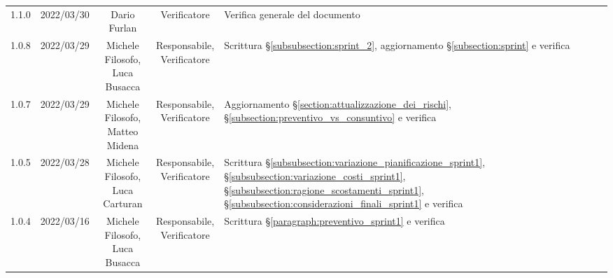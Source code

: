 \begin{center}
\begin{longtable}[c]{c | c | c | c | p{5cm}}
		1.1.0                                                      & 2022/03/30 & Dario Furlan                           & Verificatore   & Verifica generale del documento                                                                                                           \\
		1.0.8                                                      & 2022/03/29 & \Shortunderstack{Michele Filosofo,                                                                                                                                                                  \\Luca Busacca} & \Shortunderstack{Responsabile,\\Verificatore} & Scrittura §\ref{subsubsection:sprint_2}, aggiornamento §\ref{subsection:sprint} e verifica\\
		1.0.7                                                      & 2022/03/29 & \Shortunderstack{Michele Filosofo,                                                                                                                                                                  \\Matteo Midena} & \Shortunderstack{Responsabile,\\Verificatore} & Aggiornamento §\ref{section:attualizzazione_dei_rischi}, §\ref{subsection:preventivo_vs_consuntivo} e verifica\\
		1.0.5                                                      & 2022/03/28 & \Shortunderstack{Michele Filosofo,                                                                                                                                                                  \\Luca Carturan} & \Shortunderstack{Responsabile,\\Verificatore} & Scrittura §\ref{subsubsection:variazione_pianificazione_sprint1}, §\ref{subsubsection:variazione_costi_sprint1}, §\ref{subsubsection:ragione_scostamenti_sprint1}, §\ref{subsubsection:considerazioni_finali_sprint1} e verifica\\
		1.0.4                                                      & 2022/03/16 & \Shortunderstack{Michele Filosofo,                                                                                                                                                                  \\Luca Busacca} & \Shortunderstack{Responsabile,\\Verificatore} & Scrittura §\ref{paragraph:preventivo_sprint1} e verifica\\

\end{longtable}
\end{center}
